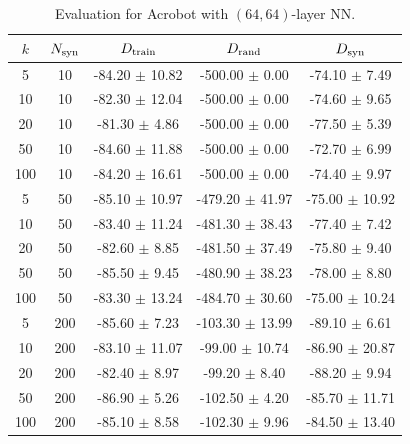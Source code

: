 \begin{table}[h!]
\centering
\caption{Evaluation for Acrobot with $(64,64)$-layer NN.}
\begin{tabular}{ccccc}
\hline
$k$ & $N_{\textnormal{syn}}$ & $D_{\textnormal{train}}$ & $D_{\textnormal{rand}}$ & $D_{\textnormal{syn}}$ \\ \hline
5 & 10 & -84.20 $\pm$ 10.82 & -500.00 $\pm$ 0.00 & -74.10 $\pm$ 7.49 \\ 
10 & 10 & -82.30 $\pm$ 12.04 & -500.00 $\pm$ 0.00 & -74.60 $\pm$ 9.65 \\ 
20 & 10 & -81.30 $\pm$ 4.86 & -500.00 $\pm$ 0.00 & -77.50 $\pm$ 5.39 \\ 
50 & 10 & -84.60 $\pm$ 11.88 & -500.00 $\pm$ 0.00 & -72.70 $\pm$ 6.99 \\ 
100 & 10 & -84.20 $\pm$ 16.61 & -500.00 $\pm$ 0.00 & -74.40 $\pm$ 9.97 \\ \hline
5 & 50 & -85.10 $\pm$ 10.97 & -479.20 $\pm$ 41.97 & -75.00 $\pm$ 10.92 \\ 
10 & 50 & -83.40 $\pm$ 11.24 & -481.30 $\pm$ 38.43 & -77.40 $\pm$ 7.42 \\ 
20 & 50 & -82.60 $\pm$ 8.85 & -481.50 $\pm$ 37.49 & -75.80 $\pm$ 9.40 \\ 
50 & 50 & -85.50 $\pm$ 9.45 & -480.90 $\pm$ 38.23 & -78.00 $\pm$ 8.80 \\ 
100 & 50 & -83.30 $\pm$ 13.24 & -484.70 $\pm$ 30.60 & -75.00 $\pm$ 10.24 \\ \hline
5 & 200 & -85.60 $\pm$ 7.23 & -103.30 $\pm$ 13.99 & -89.10 $\pm$ 6.61 \\ 
10 & 200 & -83.10 $\pm$ 11.07 & -99.00 $\pm$ 10.74 & -86.90 $\pm$ 20.87 \\ 
20 & 200 & -82.40 $\pm$ 8.97 & -99.20 $\pm$ 8.40 & -88.20 $\pm$ 9.94 \\ 
50 & 200 & -86.90 $\pm$ 5.26 & -102.50 $\pm$ 4.20 & -85.70 $\pm$ 11.71 \\
100 & 200 & -85.10 $\pm$ 8.58 & -102.30 $\pm$ 9.96 & -84.50 $\pm$ 13.40 \\ \hline
\end{tabular}
\label{tab:table6}
\end{table}
